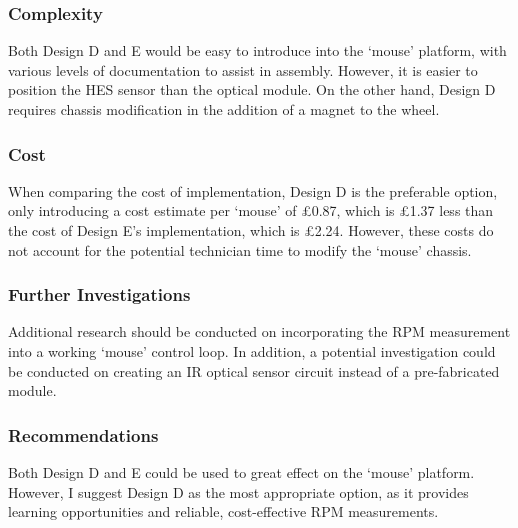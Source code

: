 \subsubsection{Complexity}
Both Design D and E would be easy to introduce into the `mouse' platform, with various levels of documentation to assist in assembly. However, it is easier to position the HES sensor than the optical module. On the other hand, Design D requires chassis modification in the addition of a magnet to the wheel.

\subsubsection{Cost}
When comparing the cost of implementation, Design D is the preferable option, only introducing a cost estimate per `mouse' of £0.87, which is £1.37 less than the cost of Design E's implementation, which is £2.24. However, these costs do not account for the potential technician time to modify the `mouse' chassis.

\subsubsection{Further Investigations}
Additional research should be conducted on incorporating the RPM measurement into a working ‘mouse’ control loop. In addition, a potential investigation could be conducted on creating an IR optical sensor circuit instead of a pre-fabricated module.

\subsubsection{Recommendations}
Both Design D and E could be used to great effect on the `mouse' platform. However, I suggest Design D as the most appropriate option, as it provides learning opportunities and reliable, cost-effective RPM measurements.